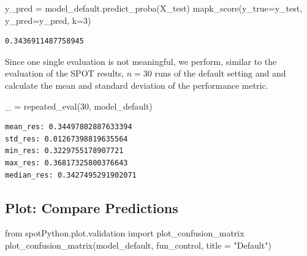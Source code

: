 \documentclass[
  letterpaper,
  DIV=11,
  numbers=noendperiod]{scrreprt}
\newenvironment{Shaded}{\begin{snugshade}}{\end{snugshade}}
\newcommand{\DecValTok}[1]{\textcolor[rgb]{0.68,0.00,0.00}{#1}}
\newcommand{\ImportTok}[1]{\textcolor[rgb]{0.00,0.46,0.62}{#1}}
\newcommand{\NormalTok}[1]{\textcolor[rgb]{0.00,0.23,0.31}{#1}}
\newcommand{\OperatorTok}[1]{\textcolor[rgb]{0.37,0.37,0.37}{#1}}
\newcommand{\StringTok}[1]{\textcolor[rgb]{0.13,0.47,0.30}{#1}}
\begin{document}
\begin{Shaded}
\begin{Highlighting}[]
\NormalTok{y\_pred }\OperatorTok{=}\NormalTok{ model\_default.predict\_proba(X\_test)}
\NormalTok{mapk\_score(y\_true}\OperatorTok{=}\NormalTok{y\_test, y\_pred}\OperatorTok{=}\NormalTok{y\_pred, k}\OperatorTok{=}\DecValTok{3}\NormalTok{)}
\end{Highlighting}
\end{Shaded}

\begin{verbatim}
0.3436911487758945
\end{verbatim}

Since one single evaluation is not meaningful, we perform, similar to
the evaluation of the SPOT results, \(n=30\) runs of the default setting
and and calculate the mean and standard deviation of the performance
metric.

\begin{Shaded}
\begin{Highlighting}[]
\NormalTok{\_ }\OperatorTok{=}\NormalTok{ repeated\_eval(}\DecValTok{30}\NormalTok{, model\_default)}
\end{Highlighting}
\end{Shaded}

\begin{verbatim}
mean_res: 0.34497802887633394
std_res: 0.01267398819635564
min_res: 0.3229755178907721
max_res: 0.36817325800376643
median_res: 0.3427495291902071
\end{verbatim}

\hypertarget{plot-compare-predictions-1}{%
\subsection{Plot: Compare
Predictions}\label{plot-compare-predictions-1}}

\begin{Shaded}
\begin{Highlighting}[]
\ImportTok{from}\NormalTok{ spotPython.plot.validation }\ImportTok{import}\NormalTok{ plot\_confusion\_matrix}
\NormalTok{plot\_confusion\_matrix(model\_default, fun\_control, title }\OperatorTok{=} \StringTok{"Default"}\NormalTok{)}
\end{Highlighting}
\end{Shaded}
\end{document}
